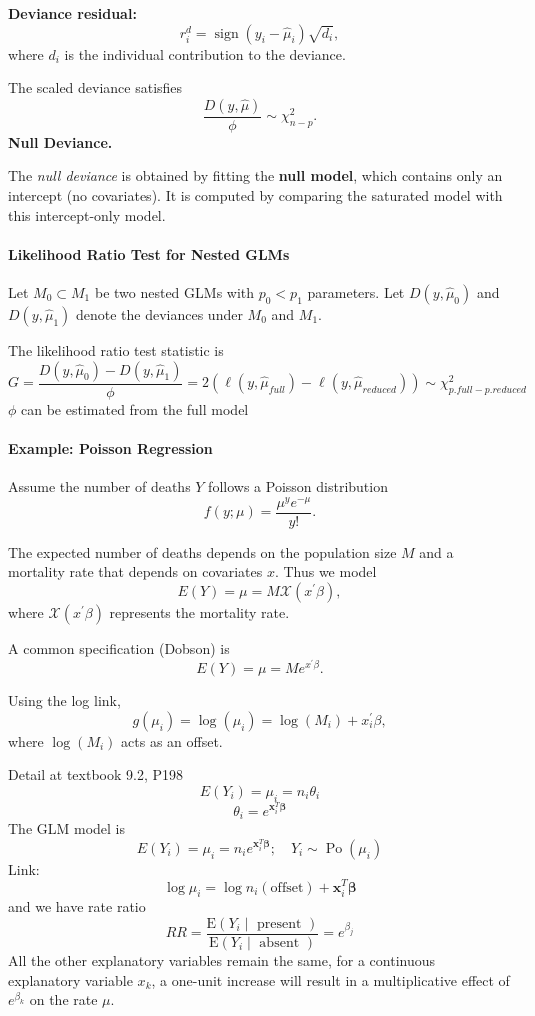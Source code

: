 \documentclass[11pt]{article}
\theoremstyle{definition}
\begin{document}
\textbf{Deviance residual:}
\[
r_i^d =
\operatorname{sign}(y_i-\hat{\mu}_i)
\sqrt{d_i},
\]
where $d_i$ is the individual contribution to the deviance.

The scaled deviance satisfies
\[
\frac{D(y,\hat{\mu})}{\phi} \sim \chi^2_{n-p}.
\]
\textbf{Null Deviance.}

The \emph{null deviance} is obtained by fitting the \textbf{null model}, which contains only an intercept (no covariates).  
It is computed by comparing the saturated model with this intercept-only model.
\paragraph{Likelihood Ratio Test for Nested GLMs}
Let $M_0 \subset M_1$ be two nested GLMs with $p_0 < p_1$ parameters.  
Let $D(y,\hat{\mu}_0)$ and $D(y,\hat{\mu}_1)$ denote the deviances under $M_0$ and $M_1$.

The likelihood ratio test statistic is
\[
G
=
\frac{D(y,\hat{\mu}_0)-D(y,\hat{\mu}_1)}{\phi} = 2(\ell(y,\hat\mu_{full}) - \ell(y,\hat\mu_{reduced}))\sim \chi^2_{p.full-p.reduced}
\]
$\phi$ can be estimated from the full model

\paragraph{Example: Poisson Regression}
Assume the number of deaths $Y$ follows a Poisson distribution
\[
f(y;\mu)=\frac{\mu^y e^{-\mu}}{y!}.
\]

The expected number of deaths depends on the population size $M$ and a mortality rate that depends on covariates $x$. Thus we model
\[
E(Y) = \mu = M \mathcal{X}(x^\prime \beta),
\]
where $\mathcal{X}(x^\prime \beta)$ represents the mortality rate.

A common specification (Dobson) is
\[
E(Y) = \mu = M e^{x^\prime \beta}.
\]

Using the log link,
\[
g(\mu_i) = \log(\mu_i) = \log(M_i) + x_i^\prime \beta,
\]
where $\log(M_i)$ acts as an offset.

Detail at textbook 9.2, P198
$$
E\left(Y_i\right)=\mu_i=n_i \theta_i
$$
$$
\theta_i=e^{\mathbf{x}_i^T \boldsymbol{\beta}}
$$
The GLM model is
$$
E\left(Y_i\right)=\mu_i=n_i e^{\mathbf{x}_i^T \boldsymbol{\beta}} ; \quad Y_i \sim \operatorname{Po}\left(\mu_i\right)
$$
Link:
$$
\log \mu_i=\log n_i (\text{offset})+\mathbf{x}_i^T \boldsymbol{\beta}
$$
and we have rate ratio
$$
R R=\frac{\mathrm{E}\left(Y_i \mid \text { present }\right)}{\mathrm{E}\left(Y_i \mid \text { absent }\right)}=e^{\beta_j}
$$
All the other explanatory variables remain the same, for a continuous explanatory variable $x_k$, a one-unit increase will result in a multiplicative effect of $e^{\beta_k}$ on the rate $\mu$.
\end{document}
